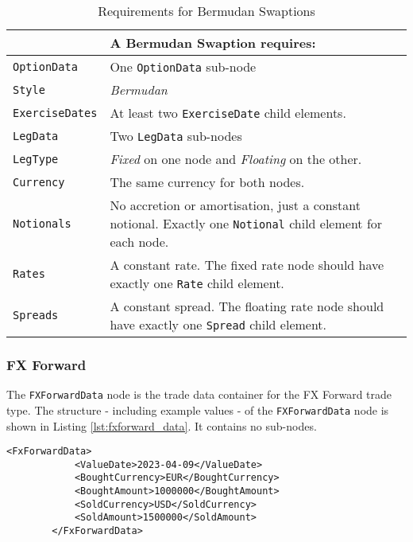 \begin{table}[H]
\centering
  \begin{tabu} to 0.9\linewidth {| X[-1.5,l,m] | X[-5,l,m] |}
    \hline
        & \bfseries{A Bermudan Swaption requires:} \\  \hline
    \lstinline!OptionData! & One \lstinline!OptionData! sub-node  \\  \hline
   \lstinline!Style! &  \emph{Bermudan}\\ \hline
    \lstinline!ExerciseDates! & At least two \lstinline!ExerciseDate! child elements.\\ \hline
    \lstinline!LegData! &  Two \lstinline!LegData! sub-nodes \\ \hline
    \lstinline!LegType! & \emph{Fixed} on one node and \emph{Floating} on the other.\\ \hline    
    \lstinline!Currency! & The same currency for both nodes.\\ \hline 
    \lstinline!Notionals! & No accretion or amortisation, just a constant notional. Exactly one \lstinline!Notional! child element for each node.\\ \hline
    \lstinline!Rates! & A constant rate. The fixed rate node should have exactly one \lstinline!Rate! child element.\\ \hline
    \lstinline!Spreads! &  A constant spread. The floating rate node should have exactly one \lstinline!Spread! child element.\\ \hline
  \end{tabu}
  \caption{Requirements for Bermudan Swaptions}
  \label{tab:bermudan_requirements}
\end{table}

\subsubsection{FX Forward}

The \lstinline!FXForwardData!  node is the trade data container for the FX Forward trade type.  The structure - including example values - of the \lstinline!FXForwardData!   node is shown in Listing \ref{lst:fxforward_data}. It contains no sub-nodes.

{\footnotesize
\begin{lstlisting}[caption=FXForwardData, label=lst:fxforward_data]
        <FxForwardData>
            <ValueDate>2023-04-09</ValueDate>
            <BoughtCurrency>EUR</BoughtCurrency>
            <BoughtAmount>1000000</BoughtAmount>
            <SoldCurrency>USD</SoldCurrency>
            <SoldAmount>1500000</SoldAmount>
        </FxForwardData>
\end{lstlisting}
}

